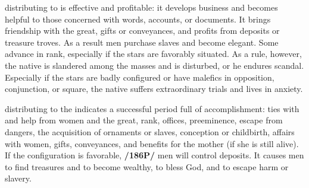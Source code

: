 \Jupiter\xspace distributing to \Mercury\xspace is effective and profitable: it develops business and becomes helpful to
those concerned with words, accounts, or documents. It brings friendship with the great, gifts or conveyances, and profits from deposits or treasure troves. As a result men purchase slaves and become elegant. Some advance in rank, especially if the stars are favorably situated. As a rule, however, the native is slandered among the masses and is disturbed, or he endures scandal. Especially if the stars are badly configured or have malefics in opposition, conjunction, or square, the native suffers extraordinary trials and lives in anxiety.

\Jupiter\xspace distributing to the \Moon\xspace indicates a successful period full of accomplishment: ties with and help from women and the great, rank, offices, preeminence, escape from dangers, the acquisition of ornaments or slaves, conception or childbirth, affairs with women, gifts, conveyances, and benefits for the mother (if she is still alive). If the configuration is favorable, \textbf{/186P/} men will control deposits. It causes men to find treasures and to become wealthy, to bless God, and to escape harm or slavery.

\newpage